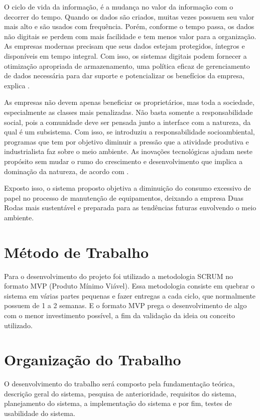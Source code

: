 O ciclo de vida da informação, é a mudança no valor da informação com o decorrer do tempo. Quando os dados são criados, muitas vezes possuem seu valor mais alto e são usados com frequência. Porém, conforme o tempo passa, os dados não digitais se perdem com mais facilidade e tem menos valor para a organização.  As empresas modernas precisam que seus dados estejam protegidos, íntegros e disponíveis em tempo integral. Com isso, os sistemas digitais podem fornecer a otimização apropriada de armazenamento, uma política eficaz de gerenciamento de dados necessária para dar suporte e potencializar os benefícios da empresa, explica \cite{somasundaram2009armazenamento}.

As empresas não devem apenas beneficiar os proprietários, mas toda a sociedade, especialmente as classes mais penalizadas. Não basta somente a responsabilidade social, pois a comunidade deve ser pensada junto a interface com a natureza, da qual é um subsistema. Com isso, se introduziu a responsabilidade socioambiental, programas que tem por objetivo diminuir a pressão que a atividade produtiva e industrialista faz sobre o meio ambiente. As inovações tecnológicas ajudam neste propósito sem mudar o rumo do crescimento e desenvolvimento que implica a dominação da natureza, de acordo com \cite{boff2017sustentabilidade}.

Exposto isso, o sistema proposto objetiva a diminuição do consumo excessivo de papel no processo de manutenção de equipamentos, deixando a empresa Duas Rodas mais sustentável e preparada para as tendências futuras envolvendo o meio ambiente.

\section{Método de Trabalho}
Para o desenvolvimento do projeto foi utilizado a metodologia SCRUM no formato MVP (Produto Mínimo Viável).
Essa metodologia consiste em quebrar o sistema em várias partes pequenas e fazer entregas a cada ciclo, que normalmente possuem de 1 a 2 semanas.
E o formato MVP prega o desenvolvimento de algo com o menor investimento possível, a fim da validação da ideia ou conceito utilizado.

\section{Organização do Trabalho}

O desenvolvimento do trabalho será composto pela fundamentação teórica, descrição geral do sistema, pesquisa de anterioridade, requisitos do sistema, planejamento do sistema, a implementação do sistema e por fim, testes de usabilidade do sistema.


